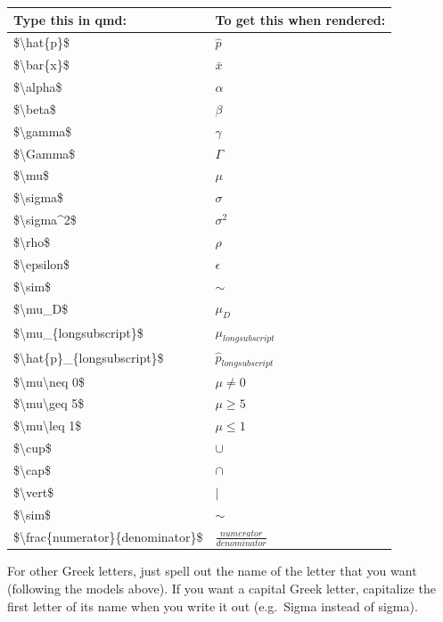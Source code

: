 \documentclass[
  letterpaper,
  DIV=11,
  numbers=noendperiod]{scrreprt}
\theoremstyle{remark}
\begin{document}
\begin{longtable}[]{@{}ll@{}}
\toprule\noalign{}
Type this in qmd: & To get this when rendered: \\
\midrule\noalign{}
\endhead
\bottomrule\noalign{}
\endlastfoot
\$\textbackslash hat\{p\}\$ & \(\hat{p}\) \\
\$\textbackslash bar\{x\}\$ & \(\bar{x}\) \\
\$\textbackslash alpha\$ & \(\alpha\) \\
\$\textbackslash beta\$ & \(\beta\) \\
\$\textbackslash gamma\$ & \(\gamma\) \\
\$\textbackslash Gamma\$ & \(\Gamma\) \\
\$\textbackslash mu\$ & \(\mu\) \\
\$\textbackslash sigma\$ & \(\sigma\) \\
\$\textbackslash sigma\^{}2\$ & \(\sigma^2\) \\
\$\textbackslash rho\$ & \(\rho\) \\
\$\textbackslash epsilon\$ & \(\epsilon\) \\
\$\textbackslash sim\$ & \(\sim\) \\
\$\textbackslash mu\_D\$ & \(\mu_D\) \\
\$\textbackslash mu\_\{longsubscript\}\$ & \(\mu_{longsubscript}\) \\
\$\textbackslash hat\{p\}\_\{longsubscript\}\$ &
\(\hat{p}_{longsubscript}\) \\
\$\textbackslash mu\textbackslash neq 0\$ & \(\mu \neq 0\) \\
\$\textbackslash mu\textbackslash geq 5\$ & \(\mu \geq 5\) \\
\$\textbackslash mu\textbackslash leq 1\$ & \(\mu \leq 1\) \\
\$\textbackslash cup\$ & \(\cup\) \\
\$\textbackslash cap\$ & \(\cap\) \\
\$\textbackslash vert\$ & \(\vert\) \\
\$\textbackslash sim\$ & \(\sim\) \\
\$\textbackslash frac\{numerator\}\{denominator\}\$ &
\(\frac{numerator}{denominator}\) \\
\end{longtable}

For other Greek letters, just spell out the name of the letter that you
want (following the models above). If you want a capital Greek letter,
capitalize the first letter of its name when you write it out
(e.g.~Sigma instead of sigma).
\end{document}
